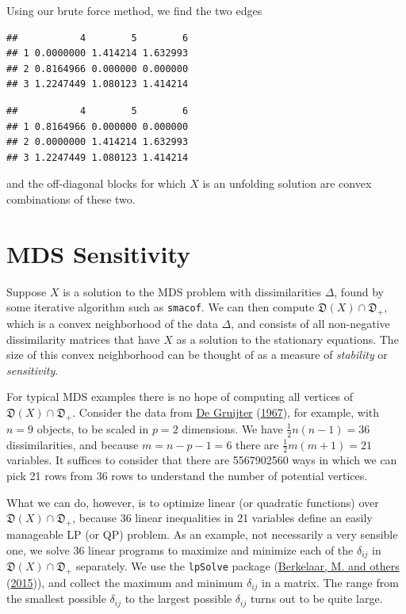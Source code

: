 \documentclass[
  12pt,
]{book}
\theoremstyle{definition}
\theoremstyle{definition}
\theoremstyle{definition}
\theoremstyle{definition}
\theoremstyle{remark}
\begin{document}
Using our brute force method, we find the two edges

\begin{verbatim}
##           4        5        6
## 1 0.0000000 1.414214 1.632993
## 2 0.8164966 0.000000 0.000000
## 3 1.2247449 1.080123 1.414214
\end{verbatim}

\begin{verbatim}
##           4        5        6
## 1 0.8164966 0.000000 0.000000
## 2 0.0000000 1.414214 1.632993
## 3 1.2247449 1.080123 1.414214
\end{verbatim}

and the off-diagonal blocks for which \(X\) is an unfolding solution are convex combinations of these two.

\hypertarget{mds-sensitivity}{%
\section{MDS Sensitivity}\label{mds-sensitivity}}

Suppose \(X\) is a solution to the MDS problem with dissimilarities \(\Delta\), found by some iterative algorithm such as \texttt{smacof}. We can then compute \(\mathfrak{D}(X)\cap\mathfrak{D}_+\), which is a convex neighborhood of the data \(\Delta\), and consists of all non-negative dissimilarity matrices that have \(X\) as a solution to the stationary equations. The size of this convex neighborhood can be thought of as a measure of \emph{stability} or \emph{sensitivity}.

For typical MDS examples there is no hope of computing all vertices of \(\mathfrak{D}(X)\cap\mathfrak{D}_+\). Consider the data from \protect\hyperlink{ref-degruijter_67}{De Gruijter} (\protect\hyperlink{ref-degruijter_67}{1967}), for example, with
\(n=9\) objects, to be scaled in \(p=2\) dimensions. We have \(\frac12 n(n-1)=36\) dissimilarities, and because \(m=n-p-1=6\) there are
\(\frac12 m(m+1)=21\) variables. It suffices to consider that there are 5567902560 ways in which we can pick 21 rows from 36 rows to understand the number of potential vertices.

What we can do, however, is to optimize linear (or quadratic functions) over \(\mathfrak{D}(X)\cap\mathfrak{D}_+\), because 36 linear inequalities in
21 variables define an easily manageable LP (or QP) problem. As an example, not necessarily a very sensible one, we solve 36 linear programs to maximize and minimize each of the \(\delta_{ij}\) in \(\mathfrak{D}(X)\cap\mathfrak{D}_+\) separately. We use the \texttt{lpSolve} package (\protect\hyperlink{ref-berkelaar_15}{Berkelaar, M. and others} (\protect\hyperlink{ref-berkelaar_15}{2015})), and collect the maximum and minimum \(\delta_{ij}\) in a matrix. The range from the smallest possible
\(\delta_{ij}\) to the largest possible \(\delta_{ij}\) turns out to be quite large.
\end{document}
